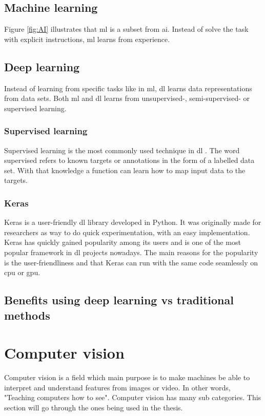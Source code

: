 \documentclass[USenglish]{ifimaster}  %
\begin{document}
\subsection{Machine learning}
Figure \ref{fig:AI} illustrates that \ac{ml} is a subset from \ac{ai}. Instead of solve the task with explicit instructions, \ac{ml} learns from experience.
\subsection{Deep learning}
Instead of learning from specific tasks like in \ac{ml}, \ac{dl} learns data representations from data sets. Both \ac{ml} and \ac{dl} learns from unsupervised-, semi-supervised- or supervised learning. 
\subsubsection{Supervised learning}
Supervised learning is the most commonly used technique in \ac{dl} \cite{Francois_Deep_learning_with_python}. The word supervised refers to known targets or annotations in the form of a labelled data set. With that knowledge a function can learn how to map input data to the targets. 
\subsubsection{Keras}
Keras is a user-friendly \ac{dl} library developed in Python. It was originally made for researchers as way to do quick experimentation, with an easy implementation. Keras has quickly gained popularity among its users and is one of the most popular framework in \ac{dl} projects nowadays. The main reasons for the popularity is the user-friendliness and that Keras can run with the same code seamlessly on \ac{cpu} or \ac{gpu}\cite{Francois_Deep_learning_with_python}.
\subsection{Benefits using deep learning vs traditional methods}
\section{Computer vision}
Computer vision is a field which main purpose is to make machines be able to interpret and understand features from images or video. In other words, "Teaching computers how to see"\cite{website:maskinsyn-intro}. Computer vision has many sub categories. This section will go through the ones being used in the thesis.
\end{document}

